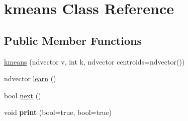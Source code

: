 \hypertarget{classkmeans}{\section{kmeans Class Reference}
\label{classkmeans}
}
\subsection*{Public Member Functions}
\begin{DoxyCompactItemize}
\item 
\hyperlink{classkmeans_ac2121c76e7ae447fd2648a28a58e5c52}{kmeans} (ndvector v, int k, ndvector centroids=ndvector())
\item 
ndvector \hyperlink{classkmeans_a25b13fed76549383111117db130b05da}{learn} ()
\item 
bool \hyperlink{classkmeans_a95382ac7e6e7bc8b730b82aab8fab9d4}{next} ()
\item 
\hypertarget{classkmeans_a0094f68b0cde338361ce1918b8e93563}{void {\bfseries print} (bool=true, bool=true)}\label{classkmeans_a0094f68b0cde338361ce1918b8e93563}

\end{DoxyCompactItemize}
